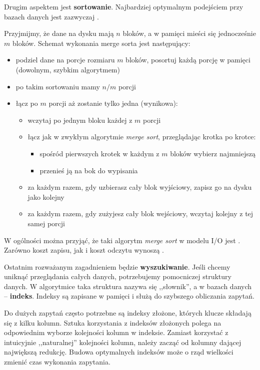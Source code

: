 \bigskip
Drugim aspektem jest \textbf{sortowanie}. Najbardziej optymalnym podejściem przy bazach danych jest zazwyczaj .

Przyjmijmy, że dane na dysku mają $n$ bloków, a w pamięci mieści się jednocześnie $m$ bloków. Schemat wykonania merge sorta jest następujący:
\begin{itemize}
    \item podziel dane na porcje rozmiaru $m$ bloków, posortuj każdą porcję w pamięci (dowolnym, szybkim algorytmem)
    \item po takim sortowaniu mamy $n/m$ porcji
    \item łącz po $m$ porcji aż zostanie tylko jedna (wynikowa):
    \begin{itemize}
        \item wczytaj po jednym bloku każdej z $m$ porcji
        \item łącz jak w zwykłym algorytmie \textit{merge sort}, przeglądając krotka po krotce:
        \begin{itemize}
            \item spośród pierwszych krotek w każdym z $m$ bloków wybierz najmniejszą
            \item przenieś ją na bok do wypisania
        \end{itemize}
        \item za każdym razem, gdy uzbierasz cały blok wyjściowy, zapisz go na dysku jako kolejny
        \item za każdym razem, gdy zużyjesz cały blok wejściowy, wczytaj kolejny z tej samej porcji
    \end{itemize}
\end{itemize}

W ogólności można przyjąć, że taki algorytm \textit{merge sort} w modelu I/O jest . Zarówno koszt zapisu, jak i koszt odczytu wynoszą .

\bigskip
Ostatnim rozważanym zagadnieniem będzie \textbf{wyszukiwanie}. Jeśli chcemy uniknąć przeglądania całych danych, potrzebujemy pomocniczej struktury danych. W algorytmice taka struktura nazywa się ,,słownik'', a w bazach danych -- \textbf{indeks}. Indeksy są zapisane w pamięci i służą do szybszego obliczania zapytań.

Do dużych zapytań często potrzebne są indeksy złożone, których klucze składają się z kilku kolumn. Sztuka korzystania z indeksów złożonych polega na odpowiednim wyborze kolejności kolumn w indeksie. Zamiast korzystać z intuicyjnie ,,naturalnej'' kolejności kolumn, należy zacząć
od kolumny dającej największą redukcję. Budowa optymalnych indeksów może o rząd wielkości zmienić czas wykonania zapytania.

